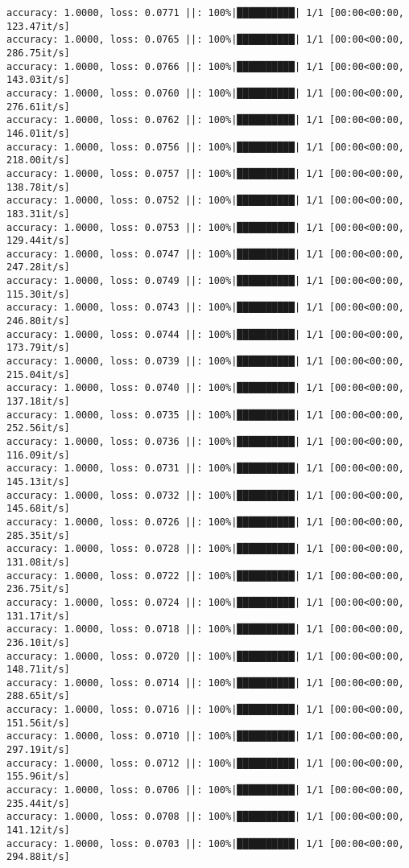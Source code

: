 \documentclass[
]{article}
\begin{document}
\begin{verbatim}
accuracy: 1.0000, loss: 0.0771 ||: 100%|██████████| 1/1 [00:00<00:00, 123.47it/s]
accuracy: 1.0000, loss: 0.0765 ||: 100%|██████████| 1/1 [00:00<00:00, 286.75it/s]
accuracy: 1.0000, loss: 0.0766 ||: 100%|██████████| 1/1 [00:00<00:00, 143.03it/s]
accuracy: 1.0000, loss: 0.0760 ||: 100%|██████████| 1/1 [00:00<00:00, 276.61it/s]
accuracy: 1.0000, loss: 0.0762 ||: 100%|██████████| 1/1 [00:00<00:00, 146.01it/s]
accuracy: 1.0000, loss: 0.0756 ||: 100%|██████████| 1/1 [00:00<00:00, 218.00it/s]
accuracy: 1.0000, loss: 0.0757 ||: 100%|██████████| 1/1 [00:00<00:00, 138.78it/s]
accuracy: 1.0000, loss: 0.0752 ||: 100%|██████████| 1/1 [00:00<00:00, 183.31it/s]
accuracy: 1.0000, loss: 0.0753 ||: 100%|██████████| 1/1 [00:00<00:00, 129.44it/s]
accuracy: 1.0000, loss: 0.0747 ||: 100%|██████████| 1/1 [00:00<00:00, 247.28it/s]
accuracy: 1.0000, loss: 0.0749 ||: 100%|██████████| 1/1 [00:00<00:00, 115.30it/s]
accuracy: 1.0000, loss: 0.0743 ||: 100%|██████████| 1/1 [00:00<00:00, 246.80it/s]
accuracy: 1.0000, loss: 0.0744 ||: 100%|██████████| 1/1 [00:00<00:00, 173.79it/s]
accuracy: 1.0000, loss: 0.0739 ||: 100%|██████████| 1/1 [00:00<00:00, 215.04it/s]
accuracy: 1.0000, loss: 0.0740 ||: 100%|██████████| 1/1 [00:00<00:00, 137.18it/s]
accuracy: 1.0000, loss: 0.0735 ||: 100%|██████████| 1/1 [00:00<00:00, 252.56it/s]
accuracy: 1.0000, loss: 0.0736 ||: 100%|██████████| 1/1 [00:00<00:00, 116.09it/s]
accuracy: 1.0000, loss: 0.0731 ||: 100%|██████████| 1/1 [00:00<00:00, 145.13it/s]
accuracy: 1.0000, loss: 0.0732 ||: 100%|██████████| 1/1 [00:00<00:00, 145.68it/s]
accuracy: 1.0000, loss: 0.0726 ||: 100%|██████████| 1/1 [00:00<00:00, 285.35it/s]
accuracy: 1.0000, loss: 0.0728 ||: 100%|██████████| 1/1 [00:00<00:00, 131.08it/s]
accuracy: 1.0000, loss: 0.0722 ||: 100%|██████████| 1/1 [00:00<00:00, 236.75it/s]
accuracy: 1.0000, loss: 0.0724 ||: 100%|██████████| 1/1 [00:00<00:00, 131.17it/s]
accuracy: 1.0000, loss: 0.0718 ||: 100%|██████████| 1/1 [00:00<00:00, 236.10it/s]
accuracy: 1.0000, loss: 0.0720 ||: 100%|██████████| 1/1 [00:00<00:00, 148.71it/s]
accuracy: 1.0000, loss: 0.0714 ||: 100%|██████████| 1/1 [00:00<00:00, 288.65it/s]
accuracy: 1.0000, loss: 0.0716 ||: 100%|██████████| 1/1 [00:00<00:00, 151.56it/s]
accuracy: 1.0000, loss: 0.0710 ||: 100%|██████████| 1/1 [00:00<00:00, 297.19it/s]
accuracy: 1.0000, loss: 0.0712 ||: 100%|██████████| 1/1 [00:00<00:00, 155.96it/s]
accuracy: 1.0000, loss: 0.0706 ||: 100%|██████████| 1/1 [00:00<00:00, 235.44it/s]
accuracy: 1.0000, loss: 0.0708 ||: 100%|██████████| 1/1 [00:00<00:00, 141.12it/s]
accuracy: 1.0000, loss: 0.0703 ||: 100%|██████████| 1/1 [00:00<00:00, 294.88it/s]

\end{verbatim}
\end{document}
